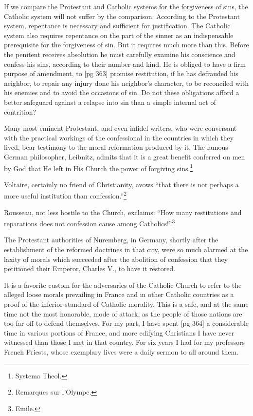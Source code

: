 If we compare the Protestant and Catholic systems
for the forgiveness of sins, the Catholic system
will not suffer by the comparison. According
to the Protestant system, repentance is necessary
and sufficient for justification. The Catholic
system also requires repentance on the part of the
sinner as an indispensable prerequisite for the forgiveness
of sin. But it requires much more than
this. Before the penitent receives absolution he
must carefully examine his conscience and confess
his sins, according to their number and kind. He
is obliged to have a firm purpose of amendment, to
[pg 363]
promise restitution, if he has defrauded his neighbor,
to repair any injury done his neighbor's
character, to be reconciled with his enemies and to
avoid the occasions of sin. Do not these obligations
afford a better safeguard against a relapse
into sin than a simple internal act of contrition?

Many most eminent Protestant, and even infidel
writers, who were conversant with the practical
workings of the confessional in the countries in
which they lived, bear testimony to the moral
reformation produced by it. The famous German
philosopher, Leibnitz, admits that it is a great
benefit conferred on men by God that He left in
His Church the power of forgiving sins.\footnote{Systema Theol.}

Voltaire, certainly no friend of Christianity,
avows “that there is not perhaps a more useful
institution than confession.”\footnote{Remarques sur l'Olympe.}

Rousseau, not less hostile to the Church, exclaims:
“How many restitutions and reparations
does not confession cause among Catholics!”\footnote{Emile.}

The Protestant authorities of Nuremberg, in
Germany, shortly after the establishment of the
reformed doctrines in that city, were so much
alarmed at the laxity of morals which succeeded
after the abolition of confession that they petitioned
their Emperor, Charles V., to have it restored.

It is a favorite custom for the adversaries of
the Catholic Church to refer to the alleged loose
morals prevailing in France and in other Catholic
countries as a proof of the inferior standard of
Catholic morality. This is a safe, and at the same
time not the most honorable, mode of attack, as
the people of those nations are too far off to defend
themselves. For my part, I have spent
[pg 364]
a considerable time in various portions of France,
and more edifying Christians I have never witnessed
than those I met in that country. For six
years I had for my professors French Priests,
whose exemplary lives were a daily sermon to all
around them.

